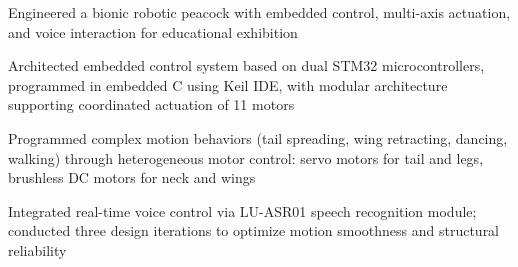 \begin{cventries}
      {
        Engineered a bionic robotic peacock with embedded control, multi-axis actuation, and voice interaction for educational exhibition
        \begin{cvitems}
          \item{Architected embedded control system based on dual STM32 microcontrollers, programmed in embedded C using Keil IDE, with modular architecture supporting coordinated actuation of 11 motors}
          \item{Programmed complex motion behaviors (tail spreading, wing retracting, dancing, walking) through heterogeneous motor control: servo motors for tail and legs, brushless DC motors for neck and wings}
          \item{Integrated real-time voice control via LU-ASR01 speech recognition module; conducted three design iterations to optimize motion smoothness and structural reliability}
        \end{cvitems}
      \vspace{1mm}
      }
\end{cventries}
